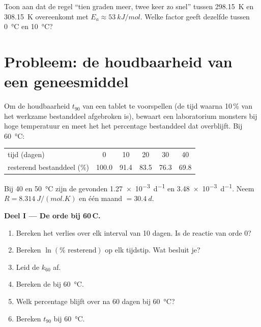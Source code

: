 \begin{exercise}[$\star\star\star$]\label{exo:b1:rate-laws:12}
Toon aan dat de regel ``tien graden meer, twee keer zo snel'' tussen
\qty{298.15}{K} en \qty{308.15}{K} overeenkomt met $E_a \approx
\qty{53}{kJ/mol}$. Welke factor geeft dezelfde  tussen
\qty{0}{\celsius} en \qty{10}{\celsius}?
\end{exercise}

\section{Probleem: de houdbaarheid van een geneesmiddel}

\begin{problem}
\label{pb:b1:rate-laws:1}
Om de houdbaarheid $t_{90}$ van een tablet te voorspellen (de tijd waarna
10\,\% van het werkzame bestanddeel afgebroken is), bewaart een
laboratorium monsters bij hoge temperatuur en meet het het percentage
bestanddeel dat overblijft. Bij \qty{60}{\celsius}:
\begin{center}
\begin{tabular}{lccccc}
\hline
tijd (dagen) & 0 & 10 & 20 & 30 & 40 \\
resterend bestanddeel (\%) & 100.0 & 91.4 & 83.5 & 76.3 & 69.8 \\
\hline
\end{tabular}
\end{center}
Bij 40 en \qty{50}{\celsius} zijn de gevonden 
\qty{1.27e-3}{d^{-1}} en \qty{3.48e-3}{d^{-1}}. Neem $R =
\qty{8.314}{J/(mol.K)}$ en één maand $= \qty{30.4}{d}$.

\medskip
\noindent\textbf{Deel I --- De orde bij 60\,\textdegree C.}
\begin{enumerate}
  \item Bereken het verlies over elk interval van 10 dagen. Is de
        reactie van orde 0?
  \item Bereken $\ln(\%\text{ resterend})$ op elk tijdstip. Wat besluit je?
  \item Leid de  $k_{60}$ af.
  \item Bereken de  bij \qty{60}{\celsius}.
  \item Welk percentage blijft over na 60 dagen bij \qty{60}{\celsius}?
  \item Bereken $t_{90}$ bij \qty{60}{\celsius}.
\end{enumerate}


\end{problem}
